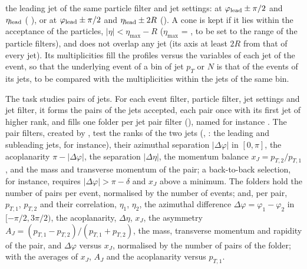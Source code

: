 the leading jet of the same particle filter and jet settings: at $\varphi_{\rm lead}\pm\pi/2$ and $\eta_{\rm lead}$
( ), or at $\varphi_{\rm lead}\pm\pi/2$ and $\eta_{\rm lead}\pm 2R$
(). A cone is kept if it lies within the acceptance of the particles,
$|\eta| < \eta_{\max} - R$ ($\eta_{\max}$ = , to be set to the range of the particle filters), and does
not overlap any jet (its axis at least $2R$ from that of every jet). Its multiplicities fill the profiles versus the
variables of each jet of the event, so that the underlying event of a bin of jet $p_T$ or $N$ is that of the events of
its jets, to be compared with the multiplicities within the jets of the same bin.

The task  studies pairs of jets. For each event filter, particle filter, jet settings and jet filter,
it forms the pairs of the jets accepted, each pair once with its first jet of higher rank, and fills one folder per jet
pair filter (), named for instance . The pair
filters, created by , test the ranks of the two jets (, : the leading
and subleading jets, for instance), their azimuthal separation $|\Delta\varphi|$ in $[0,\pi]$, the acoplanarity
$\pi - |\Delta\varphi|$, the separation $|\Delta\eta|$, the momentum balance $x_J = p_{T,2}/p_{T,1}$, and the mass and
transverse momentum of the pair; a back-to-back selection, for instance, requires $|\Delta\varphi| > \pi - \delta$ and
$x_J$ above a minimum. The folders hold the number of pairs per event, normalised by the number of events; and, per
pair, $p_{T,1}$, $p_{T,2}$ and their correlation, $\eta_1$, $\eta_2$, the azimuthal difference
$\Delta\varphi = \varphi_1 - \varphi_2$ in $[-\pi/2, 3\pi/2)$, the acoplanarity, $\Delta\eta$, $x_J$, the asymmetry
$A_J = (p_{T,1}-p_{T,2})/(p_{T,1}+p_{T,2})$, the mass, transverse momentum and rapidity of the pair, and $\Delta\varphi$
versus $x_J$, normalised by the number of pairs of the folder; with the averages of $x_J$, $A_J$ and the acoplanarity
versus $p_{T,1}$.


